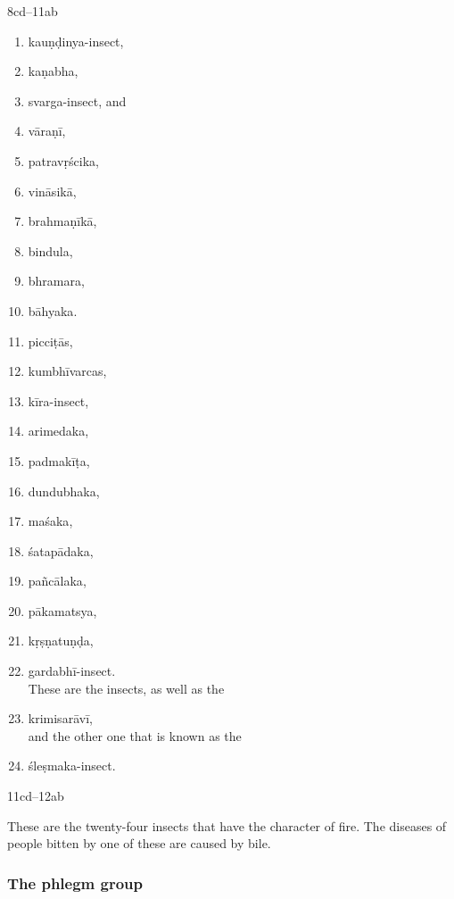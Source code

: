 \begin{translation}
\item[8cd--11ab]
\begin{multicols}{2}
    \begin{enumerate}
        \item \Gls{kauṇḍinya-insect},
        \item \Gls{kaṇabha},
        \item \Gls{svarga-insect}, and
        \item \Gls{vāraṇī},
         \item \Gls{patravṛścika},
        \item \Gls{vināsikā},
        \item \Gls{brahmaṇīkā},
        \item \Gls{bindula},
        \item \Gls{bhramara},
        \item \Gls{bāhyaka}.
        \item \Glspl{picciṭā}, 
        \item \Gls{kumbhīvarcas}, 
        \item \Gls{kīra-insect}, 
        \item \Gls{arimedaka},
        \item \Gls{padmakīṭa},
        \item \Gls{dundubhaka},
        \item \Gls{maśaka},
        \item \Gls{śatapādaka},
        \item \Gls{pañcālaka},
        \item \Gls{pākamatsya},\label{pakamatsya}
        \item \Gls{kṛṣṇatuṇḍa},
        \item \Gls{gardabhī-insect}.\\
                These are the insects, as well as the 
        \item \Gls{krimisarāvī},\\ and the 
        other one that is known as the
        \item \Gls{śleṣmaka-insect}.       
        \end{enumerate}
    \end{multicols}

\item[11cd--12ab]

These are the twenty-four insects that have the character of fire. 
The diseases of people bitten by one of these are caused by bile.


\subsubsection{The phlegm group}


\end{translation}
